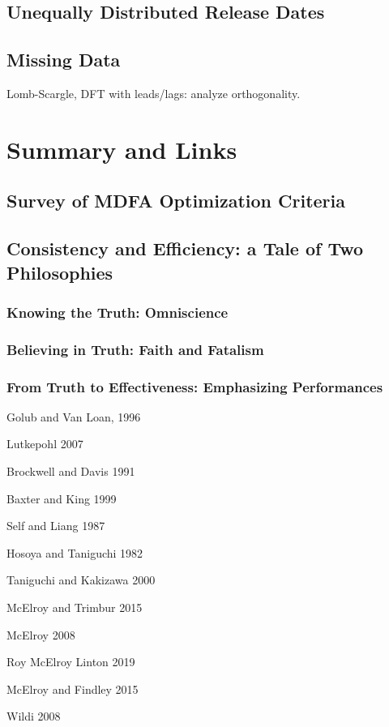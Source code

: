 \documentclass[a4paper]{book}
\begin{document}
\section{Unequally Distributed Release Dates}

\section{Missing Data}

Lomb-Scargle, DFT with leads/lags: analyze orthogonality.






\chapter{Summary and Links}

\section{Survey of MDFA Optimization Criteria}

\section{Consistency and Efficiency: a Tale of Two Philosophies}

\subsection{Knowing the Truth: Omniscience}

\subsection{Believing in Truth: Faith and Fatalism}

\subsection{From Truth to Effectiveness: Emphasizing Performances}


\begin{thebibliography}{}

\bibitem{} Golub and Van Loan, 1996

\bibitem{}  Lutkepohl 2007

\bibitem{}  Brockwell and Davis 1991

\bibitem{} Baxter and King 1999

\bibitem{} Self and Liang 1987

\bibitem{} Hosoya and Taniguchi 1982

\bibitem{} Taniguchi and Kakizawa 2000

\bibitem{} McElroy and Trimbur 2015

\bibitem{} McElroy 2008

\bibitem{} Roy McElroy Linton 2019

\bibitem{} McElroy and Findley 2015

\bibitem{} Wildi 2008




\end{thebibliography}
\end{document}
